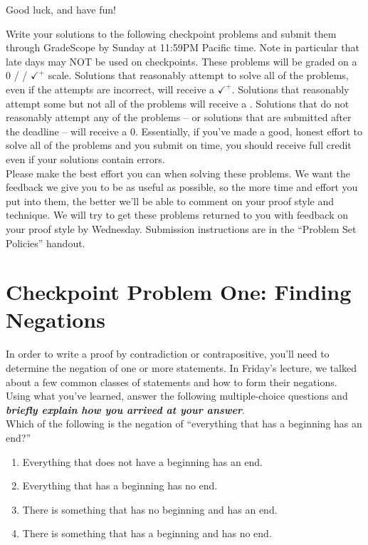 \documentclass{article}
\renewcommand{\(}{\left(}
\renewcommand{\)}{\right)}
\theoremstyle{plain}
\theoremstyle{plain}
\theoremstyle{definition}
\begin{document}
Good luck, and have fun! \pagebreak

Write your solutions to the following checkpoint problems and submit them through GradeScope by Sunday at 11:59PM Pacific time. Note in particular that late days may NOT be used on checkpoints. These problems will be graded on a 0 / \checkmark / $\checkmark^+$ scale. Solutions that reasonably attempt to solve all of the problems, even if the attempts are incorrect, will receive a $\checkmark^+$. Solutions that reasonably attempt some but not all of the problems will receive a \checkmark. Solutions that do not reasonably attempt any of the problems -- or solutions that are submitted after the deadline -- will receive a 0. Essentially, if you've made a good, honest effort to solve all of the problems and you submit on time, you should receive full credit even if your solutions contain errors. \\

Please make the best effort you can when solving these problems. We want the feedback we give you to be as useful as possible, so the more time and effort you put into them, the better we'll be able to comment on your proof style and technique. We will try to get these problems returned to you with feedback on your proof style by Wednesday. Submission instructions are in the ``Problem Set Policies'' handout.

\section*{Checkpoint Problem One: Finding Negations}

In order to write a proof by contradiction or contrapositive, you'll need to determine the negation of one or more statements. In Friday's lecture, we talked about a few common classes of statements and how to form their negations. Using what you've learned, answer the following multiple-choice questions and \textit{\textbf{briefly explain how you arrived at your answer}}. \\

Which of the following is the negation of ``everything that has a beginning has an end?''

\begin{enumerate}[label=\Alph*)]
    \item Everything that does not have a beginning has an end.
    \item Everything that has a beginning has no end.
    \item There is something that has no beginning and has an end.
    \item There is something that has a beginning and has no end.
\end{enumerate}
\end{document}
